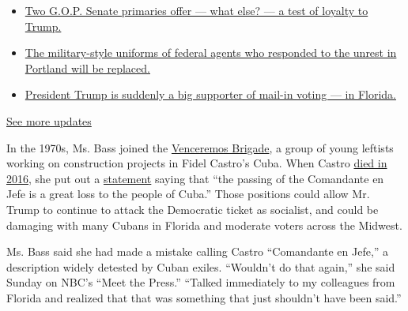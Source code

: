 \begin{itemize}
\tightlist
\item
  \href{https://www.nytimes.com/2020/08/04/us/elections/primary-election-michigan-arizona-kansas.html?action=click\&pgtype=Article\&state=default\&region=MAIN_CONTENT_1\&context=storylines_live_updates\#link-3924dd44}{Two
  G.O.P. Senate primaries offer --- what else? --- a test of loyalty to
  Trump.}
\item
  \href{https://www.nytimes.com/2020/08/04/us/elections/primary-election-michigan-arizona-kansas.html?action=click\&pgtype=Article\&state=default\&region=MAIN_CONTENT_1\&context=storylines_live_updates\#link-62a8e06b}{The
  military-style uniforms of federal agents who responded to the unrest
  in Portland will be replaced.}
\item
  \href{https://www.nytimes.com/2020/08/04/us/elections/primary-election-michigan-arizona-kansas.html?action=click\&pgtype=Article\&state=default\&region=MAIN_CONTENT_1\&context=storylines_live_updates\#link-32b39e33}{President
  Trump is suddenly a big supporter of mail-in voting --- in Florida.}
\end{itemize}

\href{https://www.nytimes.com/2020/08/04/us/elections/primary-election-michigan-arizona-kansas.html?action=click\&pgtype=Article\&state=default\&region=MAIN_CONTENT_1\&context=storylines_live_updates}{See
more updates}

In the 1970s, Ms. Bass joined the
\href{https://www.theatlantic.com/politics/archive/2020/07/karen-bass-cuba-venceremos-brigade/614662/}{Venceremos
Brigade}, a group of young leftists working on construction projects in
Fidel Castro's Cuba. When Castro
\href{https://www.nytimes.com/2016/11/26/world/americas/fidel-castro-dies.html}{died
in 2016}, she put out a
\href{https://bass.house.gov/media-center/press-releases/rep-bass-statement-passing-fidel-castro}{statement}
saying that ``the passing of the Comandante en Jefe is a great loss to
the people of Cuba.'' Those positions could allow Mr. Trump to continue
to attack the Democratic ticket as socialist, and could be damaging with
many Cubans in Florida and moderate voters across the Midwest.

Ms. Bass said she had made a mistake calling Castro ``Comandante en
Jefe,'' a description widely detested by Cuban exiles. ``Wouldn't do
that again,'' she said Sunday on NBC's ``Meet the Press.'' ``Talked
immediately to my colleagues from Florida and realized that that was
something that just shouldn't have been said.''

